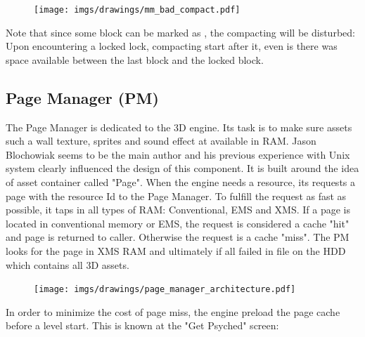 \documentclass[book.tex]{subfiles}
\begin{document}
   \par
\begin{figure}[H]
\centering
 \texttt{[image: imgs/drawings/mm\_bad\_compact.pdf]}
 \end{figure}
 \par
 Note that since some block can be marked as , the compacting will be disturbed: Upon encountering a locked lock, compacting start after it, even is there was space available between the last block and the locked block.












\subsection{Page Manager (PM)}
The Page Manager is dedicated to the 3D engine. Its task is to make sure assets such a wall texture, sprites and sound effect at available in RAM. Jason Blochowiak seems to be the main author and his previous experience with Unix system clearly influenced the design of this component. It is built around the idea of asset container called "Page". When the engine needs a resource, its requests a page with the resource Id to the Page Manager. To fulfill the request as fast as possible, it taps in all types of RAM: Conventional, EMS and XMS. If a page is located in conventional memory or EMS, the request is considered a cache "hit" and page is returned to caller. Otherwise the request is a cache "miss". The PM looks for the page in XMS RAM and ultimately if all failed in  file on the HDD which contains all 3D assets.\\
 \par
\begin{figure}[H]
\centering
 \texttt{[image: imgs/drawings/page\_manager\_architecture.pdf]}
 \end{figure}
 \par
In order to minimize the cost of page miss, the engine preload the page cache before a level start. This is known at the "Get Psyched" screen:
 \par
\end{document}
